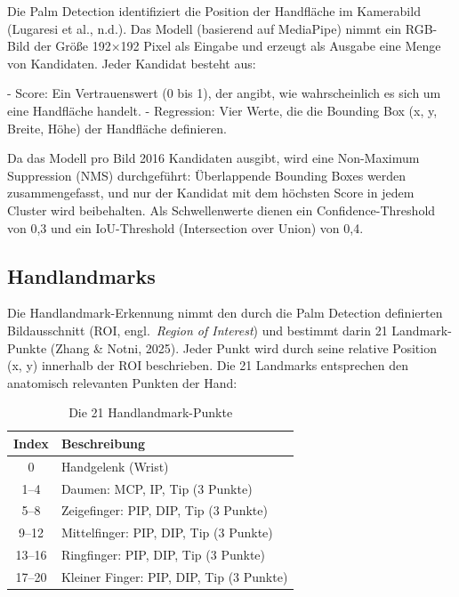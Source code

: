 Die Palm Detection identifiziert die Position der Handfläche im Kamerabild (Lugaresi et al., n.d.). Das Modell (basierend auf MediaPipe) nimmt ein RGB-Bild der Größe 192×192 Pixel als Eingabe und erzeugt als Ausgabe eine Menge von Kandidaten. Jeder Kandidat besteht aus:

- Score: Ein Vertrauenswert (0 bis 1), der angibt, wie wahrscheinlich es sich um eine Handfläche handelt.
- Regression: Vier Werte, die die Bounding Box (x, y, Breite, Höhe) der Handfläche definieren.

Da das Modell pro Bild 2016 Kandidaten ausgibt, wird eine Non-Maximum Suppression (NMS) durchgeführt: Überlappende Bounding Boxes werden zusammengefasst, und nur der Kandidat mit dem höchsten Score in jedem Cluster wird beibehalten. Als Schwellenwerte dienen ein Confidence-Threshold von 0,3 und ein IoU-Threshold (Intersection over Union) von 0,4.

\subsection{Handlandmarks}

Die Handlandmark-Erkennung nimmt den durch die Palm Detection definierten Bildausschnitt (ROI, engl.\ \textit{Region of Interest}) und bestimmt darin 21 Landmark-Punkte (Zhang \& Notni, 2025). Jeder Punkt wird durch seine relative Position (x, y) innerhalb der ROI beschrieben. Die 21 Landmarks entsprechen den anatomisch relevanten Punkten der Hand:

\begin{table}[htbp]
    \centering
    \caption{Die 21 Handlandmark-Punkte}
    \label{tab:handlandmarks}
    \begin{tabular}{|c|p{}|}
        \hline
        \textbf{Index} & \textbf{Beschreibung} \\
        \hline
        0 & Handgelenk (Wrist) \\
        \hline
        1--4 & Daumen: MCP, IP, Tip (3 Punkte) \\
        \hline
        5--8 & Zeigefinger: PIP, DIP, Tip (3 Punkte) \\
        \hline
        9--12 & Mittelfinger: PIP, DIP, Tip (3 Punkte) \\
        \hline
        13--16 & Ringfinger: PIP, DIP, Tip (3 Punkte) \\
        \hline
        17--20 & Kleiner Finger: PIP, DIP, Tip (3 Punkte) \\
        \hline
    \end{tabular}
\end{table}

